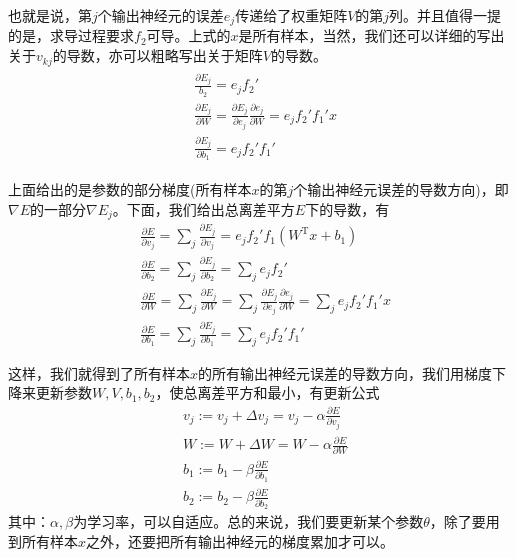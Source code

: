             也就是说，第$j$个输出神经元的误差$e_j$传递给了权重矩阵$V$的第$j$列。并且值得一提的是，求导过程要求$f_2$可导。上式的$x$是所有样本，当然，我们还可以详细的写出关于$v_{kj}$的导数，亦可以粗略写出关于矩阵$V$的导数。
            \begin{align}
            \label{全BP导数计算公式2}
            \begin{aligned}
            & \frac{\partial E_j}{b_2} = e_j f_2'\\
            & \frac{\partial E_j}{\partial W} = \frac{\partial E_j}{\partial e_j}\frac{\partial e_j}{\partial W}=e_j f_2'f_1'x\\
            & \frac{\partial E_j}{\partial b_1} = e_jf_2'f_1'
            \end{aligned}
            \end{align}
            \par
            上面给出的是参数的部分梯度(所有样本$x$的第$j$个输出神经元误差的导数方向)，即$\nabla E$的一部分$\nabla E_j$。下面，我们给出总离差平方$E$下的导数，有
            \begin{align*}
            & \frac{\partial E}{\partial v_j} = \sum_j\frac{\partial E_j}{\partial v_j} = e_j f_2'f_1(W^\mathrm{T}x+b_1)\\
            & \frac{\partial E}{\partial b_2} = \sum_j\frac{\partial E_j}{\partial b_2} =\sum_j e_j f_2'\\
            & \frac{\partial E}{\partial W} = \sum_j\frac{\partial E_j}{\partial W} = \sum_j\frac{\partial E_j}{\partial e_j}\frac{\partial e_j}{\partial W} = \sum_j e_j f_2'f_1'x\\
            & \frac{\partial E}{\partial b_1} = \sum_j\frac{\partial E_j}{\partial b_1} = \sum_j e_jf_2'f_1'
            \end{align*}
            \par
            这样，我们就得到了所有样本$x$的所有输出神经元误差的导数方向，我们用梯度下降来更新参数$W,V,b_1,b_2$，使总离差平方和最小，有更新公式
            \begin{align*}
            & v_j :=v_j+\Delta v_j = v_j-\alpha \frac{\partial E}{\partial v_j}\\
            & W:=W + \Delta W = W - \alpha \frac{\partial E}{\partial W}\\
            & b_1:=b_1 -\beta \frac{\partial E}{\partial b_1}\\
            & b_2:=b_2 - \beta \frac{\partial E}{\partial b_2}
            \end{align*}
            其中：$\alpha,\beta$为学习率，可以自适应。总的来说，我们要更新某个参数$\theta$，除了要用到所有样本$x$之外，还要把所有输出神经元的梯度累加才可以。
